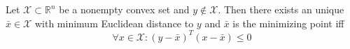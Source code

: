 Let $\mathcal{X} \subset \mathbb{R}^n$ be a nonempty convex set and $y \notin \mathcal{X}$.  Then there exists an unique $\bar{x} \in \mathcal{X}$ with minimum Euclidean distance to $y$ and $\bar{x}$ is the minimizing point iff
$$\forall x \in \mathcal{X} : (y - \bar{x})^T (x - \bar{x}) \leq 0$$ 
